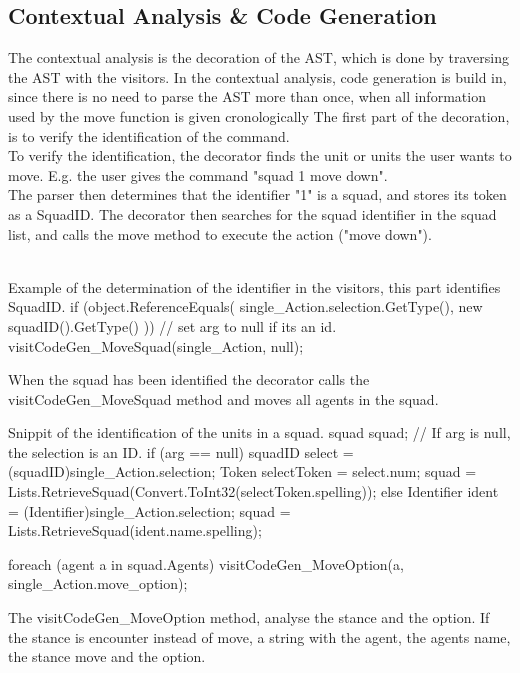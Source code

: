 \subsection{Contextual Analysis \& Code Generation}
\label{sec:ai_contextual_analysis}
The contextual analysis is the decoration of the AST, which is done by traversing the AST with the visitors. In the contextual analysis, code generation is build in, since there is no need to parse the AST more than once, when all information used by the move function is given cronologically
The first part of the decoration, is to verify the identification of the command.\\
To verify the identification, the decorator finds the unit or units the user wants to move. E.g. the user gives the command "squad 1 move down".\\
The parser then determines that the identifier "1" is a squad, and stores its token as a SquadID. The decorator then searches for the squad identifier in the squad list, and calls the move method to execute the action ("move down").\\
\\

\begin{source}{Example of the determination of the identifier in the visitors, this part identifies SquadID.}{}
if (object.ReferenceEquals(
	single_Action.selection.GetType(), 
	new squadID().GetType()
	))
	{
	// set arg to null if its an id.
	visitCodeGen_MoveSquad(single_Action, null);
	}
\end{source}

When the squad has been identified the decorator calls the visitCodeGen\_MoveSquad method and moves all agents in the squad.\\

\begin{source}{Snippit of the identification of the units in a squad.}{}
squad squad;
// If arg is null, the selection is an ID.
if (arg == null)
	{
    squadID select = (squadID)single_Action.selection;
    Token selectToken = select.num;
    squad = Lists.RetrieveSquad(Convert.ToInt32(selectToken.spelling));
	}
else
    {
		Identifier ident = (Identifier)single_Action.selection;
		squad = Lists.RetrieveSquad(ident.name.spelling);
	}

	foreach (agent a in squad.Agents)
	{
		visitCodeGen_MoveOption(a, single_Action.move_option);
	}
\end{source}

The visitCodeGen\_MoveOption method, analyse the stance and the option. If the stance is encounter instead of move, a string with the agent, the agents name, the stance move and the option.\\

